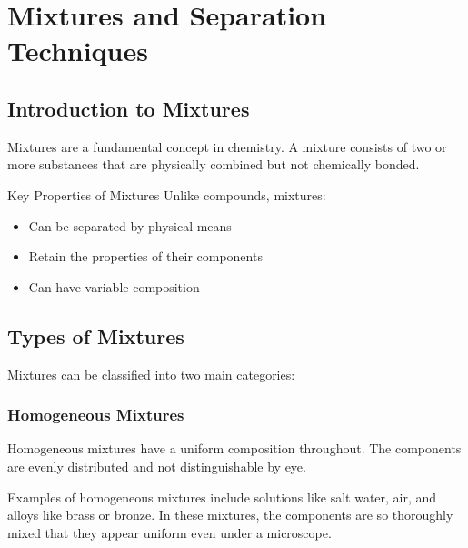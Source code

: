 \chapter{Mixtures and Separation Techniques}

\section{Introduction to Mixtures}

Mixtures are a fundamental concept in chemistry. A mixture consists of two or more substances that are physically combined but not chemically bonded.

\begin{keyconcept}{Key Properties of Mixtures}
Unlike compounds, mixtures:
\begin{itemize}
    \item Can be separated by physical means
    \item Retain the properties of their components
    \item Can have variable composition
\end{itemize}
\end{keyconcept}

\FloatBarrier %

\section{Types of Mixtures}

Mixtures can be classified into two main categories:

\subsection{Homogeneous Mixtures}

Homogeneous mixtures have a uniform composition throughout. The components are evenly distributed and not distinguishable by eye.

\begin{marginfigure}[0pt]
  \caption{Example of a homogeneous mixture: salt dissolved in water.}
  \label{fig:homogeneous}
\end{marginfigure}

Examples of homogeneous mixtures include solutions like salt water, air, and alloys like brass or bronze. In these mixtures, the components are so thoroughly mixed that they appear uniform even under a microscope.

